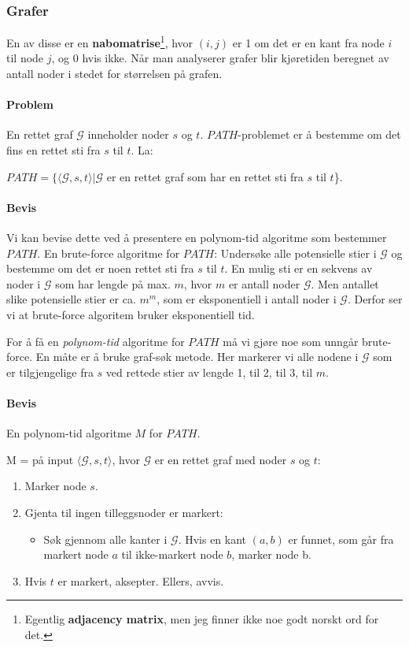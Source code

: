 \documentclass[11pt,a4paper]{article}
\begin{document}
\subsubsection{Grafer}
En av disse er en \textbf{nabomatrise}\footnote{Egentlig \textbf{adjacency matrix}, men jeg finner ikke noe godt norskt ord for det.},
hvor $(i,j)$ er 1 om det er en kant fra node $i$ til node $j$, og 0 hvis ikke. Når man analyserer grafer blir kjøretiden beregnet av antall noder i stedet for størrelsen på grafen. 

\paragraph{Problem} En rettet graf $\mathcal{G}$ inneholder noder $s$ og $t$. $PATH$-problemet er å bestemme om det fins en rettet sti fra $s$ til $t$. La:
\begin{center}
$PATH = \{\langle \mathcal{G},s,t\rangle | \mathcal{G}$ er en rettet graf som har en rettet sti fra $s$ til $t$\}.
\end{center}
\paragraph{Bevis} Vi kan bevise dette ved å presentere en polynom-tid algoritme som bestemmer $PATH$. En brute-force algoritme for $PATH$: Undersøke alle potensielle stier i $\mathcal{G}$ og bestemme om det er noen rettet sti fra $s$ til $t$. En mulig sti er en sekvens av noder i $\mathcal{G}$ som har lengde på max. $m$, hvor $m$ er antall noder $\mathcal{G}$. Men antallet slike potensielle stier er ca. $m^m$, som er eksponentiell i antall noder i $\mathcal{G}$. Derfor ser vi at brute-force algoritem bruker eksponentiell tid.

For å få en \textit{polynom-tid} algoritme for $PATH$ må vi gjøre noe som unngår brute-force. En måte er å bruke graf-søk metode.
Her markerer vi alle nodene i $\mathcal{G}$ som er tilgjengelige fra $s$ ved rettede stier av lengde 1, til 2, til 3, til $m$.

\paragraph{Bevis} En polynom-tid algoritme $M$ for $PATH$.

M = på input $\langle \mathcal{G},s,t \rangle$, hvor $\mathcal{G}$ er en rettet graf med noder $s$ og $t$:
\begin{enumerate}
\item{Marker node $s$.}
\item{Gjenta til ingen tilleggsnoder er markert:}
\begin{itemize}
\item{Søk gjennom alle kanter i $\mathcal{G}$. Hvis en kant $(a,b)$ er funnet, som går fra markert node $a$ til ikke-markert node $b$, marker node b.}
\end{itemize}
\item{Hvis $t$ er markert, aksepter. Ellers, avvis.}
\end{enumerate}
\end{document}
